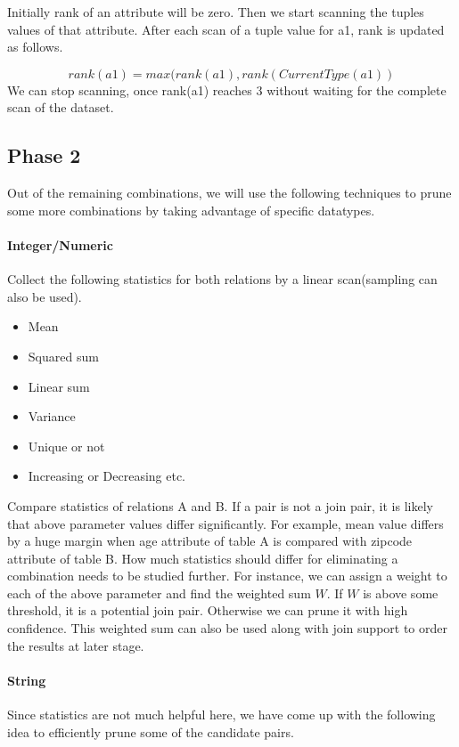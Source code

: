 \documentclass{article}
\begin{document}
Initially rank of an attribute will be zero. Then we start scanning the tuples values of that attribute. After each scan of a tuple value for a1, rank is updated as follows.

\[rank(a1) = max(rank(a1), rank(CurrentType(a1))\]
We can stop scanning, once rank(a1) reaches 3 without waiting for the complete scan of the dataset.

\subsection{Phase 2}
Out of the remaining combinations, we will use the following techniques to prune some more combinations by taking advantage of specific datatypes.

\paragraph{Integer/Numeric}

Collect the following statistics for both relations by a linear scan(sampling can also be used). 
\begin{itemize}
\item Mean
\item Squared sum
\item Linear sum
\item Variance
\item Unique or not
\item Increasing or Decreasing etc.
\end{itemize}

   Compare statistics of relations A and B. If a pair is not a join pair, it is likely that above parameter values differ significantly. For example, mean value differs by a huge margin when age attribute of table A is compared with zipcode attribute of table B. How much statistics should differ for eliminating a combination needs to be studied further. For instance, we can assign a weight to each of the above parameter and find the weighted sum $W$. If $W$ is above some threshold, it is a potential join pair. Otherwise we can prune it with high confidence. This weighted sum can also be used along with join support to order the results at later stage.
   
\paragraph{String}

Since statistics are not much helpful here, we have come up with the following idea to efficiently prune some of the candidate pairs.
\end{document}
